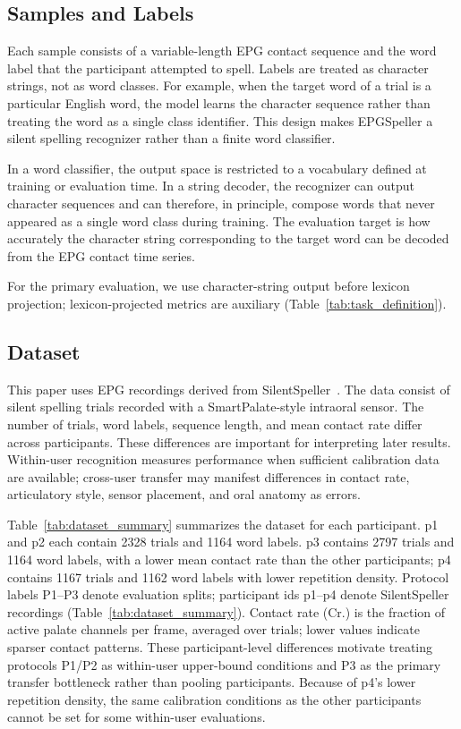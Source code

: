\subsection{Samples and Labels}

Each sample consists of a variable-length EPG contact sequence and the word label that the participant attempted to spell.
Labels are treated as character strings, not as word classes.
For example, when the target word of a trial is a particular English word, the model learns the character sequence rather than treating the word as a single class identifier.
This design makes EPGSpeller a silent spelling recognizer rather than a finite word classifier.

In a word classifier, the output space is restricted to a vocabulary defined at training or evaluation time.
In a string decoder, the recognizer can output character sequences and can therefore, in principle, compose words that never appeared as a single word class during training.
The evaluation target is how accurately the character string corresponding to the target word can be decoded from the EPG contact time series.

For the primary evaluation, we use character-string output before lexicon projection; lexicon-projected metrics are auxiliary (Table~\ref{tab:task_definition}).

\subsection{Dataset}

This paper uses EPG recordings derived from SilentSpeller~\cite{kimura2022silentspeller}.
The data consist of silent spelling trials recorded with a SmartPalate-style intraoral sensor.
The number of trials, word labels, sequence length, and mean contact rate differ across participants.
These differences are important for interpreting later results.
Within-user recognition measures performance when sufficient calibration data are available; cross-user transfer may manifest differences in contact rate, articulatory style, sensor placement, and oral anatomy as errors.

Table~\ref{tab:dataset_summary} summarizes the dataset for each participant.
p1 and p2 each contain 2328 trials and 1164 word labels.
p3 contains 2797 trials and 1164 word labels, with a lower mean contact rate than the other participants; p4 contains 1167 trials and 1162 word labels with lower repetition density.
Protocol labels P1--P3 denote evaluation splits; participant ids p1--p4 denote SilentSpeller recordings (Table~\ref{tab:dataset_summary}).
Contact rate (Cr.) is the fraction of active palate channels per frame, averaged over trials; lower values indicate sparser contact patterns.
These participant-level differences motivate treating protocols P1/P2 as within-user upper-bound conditions and P3 as the primary transfer bottleneck rather than pooling participants.
Because of p4's lower repetition density, the same calibration conditions as the other participants cannot be set for some within-user evaluations.

